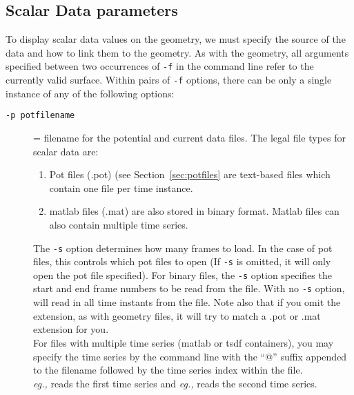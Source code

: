 \subsection{Scalar Data parameters}
\label{sec:scalarparams} 

To display scalar data values on the geometry, we must specify the source 
of the data and how to link them to the geometry.  As with the 
geometry, all arguments specified between two occurrences of \texttt{-f} 
in the command line refer to the currently valid surface.  Within pairs of
\texttt{-f} options, there can be only a single instance of any of the
following options:
%
\begin{description}
    
  \item[{\tt-p potfilename}] = filename for the potential and
    current data files.  The legal file types for scalar data are:
    \begin{enumerate}
      \item Pot files (.pot) (see Section~\ref{sec:potfiles} are 
        text-based files which contain one file per time instance.
        
      \item matlab files (.mat) are also stored in binary format.  
        Matlab files can also contain multiple time series. 
        
    \end{enumerate}
    
    The \texttt{-s} option determines how many frames to load. 
    In the case of pot files, this controls which pot files to open 
    (If \texttt{-s} is omitted, it will only open the pot file specified). 
    For binary files, the \texttt{-s} option specifies the start
    and end frame numbers to be read from the file.  With no
    \texttt{-s} option, \map{} will read in all time instants from
    the file.  Note also that if you omit the extension, as with
    geometry files, it will try to match a .pot or .mat
    extension for you. \\

    For files with multiple time series (matlab or tsdf containers),
    you may specify the time series by the command line with the ``@'' 
    suffix appended to the filename followed by the time series index 
    within the file. \\

    {\em eg.,} \hspace{.2in}{\tt -p file.mat@1} reads the first time
    series and 
    {\em eg.,} \hspace{.2in}{\tt -p file.tsdfc@2} reads the second time
    series.
    

\end{description}

